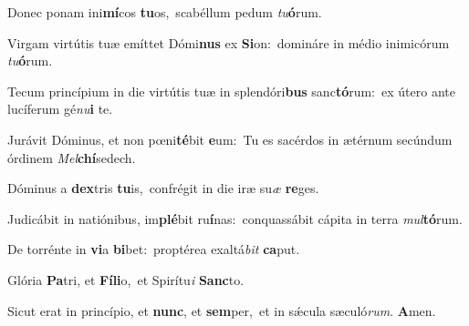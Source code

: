 ﻿\setcounter{versecount}{2}

\vs Donec ponam ini\textbf{mí}cos \textbf{tu}os,~\redgreheightstar scabéllum pedum \textit{tu}\textbf{ó}rum.

\vs Virgam virtútis tuæ emíttet Dó\-mi\-\textbf{nus} ex \textbf{Si}on:~\redgreheightstar domináre in médio inimicórum \textit{tu}\textbf{ó}rum.

\vs Tecum princípium in die virtútis tuæ in splendóri\textbf{bus} sanc\textbf{tó}rum:~\redgreheightstar ex útero ante lucíferum gé\textit{nu}\textbf{i} te.

\vs Jurávit Dóminus, et non pœni\textbf{té}bit \textbf{e}um:~\redgreheightstar Tu es sacérdos in ætérnum secúndum órdinem \textit{Mel}\textbf{chí}sedech.

\vs Dóminus a \textbf{dex}tris \textbf{tu}is,~\redgreheightstar confrégit in die iræ su\textit{æ} \textbf{re}ges.

\vs Judicábit in natiónibus, im\textbf{plé}bit ru\textbf{í}nas:~\redgreheightstar conquassábit cápita in terra \textit{mul}\textbf{tó}rum.

\vs De torrénte in \textbf{vi}a \textbf{bi}bet:~\redgreheightstar proptérea exaltá\textit{bit} \textbf{ca}put.

\vs Glória \textbf{Pa}tri, et \textbf{Fí}\textbf{li}o,~\redgreheightstar et Spirítu\textit{i} \textbf{Sanc}to.

\vs Sicut erat in princípio, et \textbf{nunc}, et \textbf{sem}per,~\redgreheightstar et in sǽcula sæculó\textit{rum}. \textbf{A}men.

